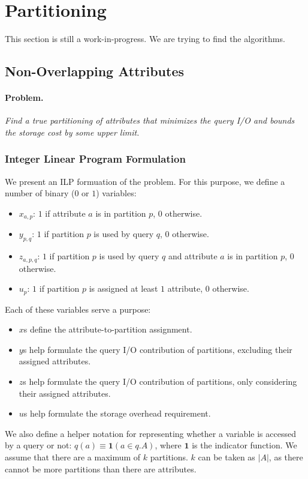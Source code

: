 \clearpage
\newpage
\section{Partitioning}
This section is still a work-in-progress. We are trying to find the algorithms.

\subsection{Non-Overlapping Attributes}

\paragraph*{Problem.$\,$} \emph{Find a true partitioning of attributes that
minimizes the query I/O and bounds the storage cost by some upper limit.}

\subsubsection{Integer Linear Program Formulation}
We present an ILP formuation of the problem. For this purpose, we define a 
number of binary ($0$ or $1$) variables: 
\begin{itemize}
\item $x_{a,p}$: $1$ if attribute $a$ is in partition $p$, $0$ otherwise.
\item $y_{p,q}$: $1$ if partition $p$ is used by query $q$, $0$ otherwise.
\item $z_{a,p,q}$: $1$ if partition $p$ is used by query $q$ and attribute $a$
is in partition $p$, $0$ otherwise.
\item $u_{p}$: $1$ if partition $p$ is assigned at least $1$ attribute, $0$ otherwise.
\end{itemize}

Each of these variables serve a purpose:
\begin{itemize}
\item $x$s define the attribute-to-partition assignment.
\item $y$s help formulate the query I/O contribution
of partitions, excluding their assigned attributes.
\item $z$s help formulate the query I/O contribution
of partitions, only considering their assigned attributes.
\item $u$s help formulate the storage overhead requirement.
\end{itemize}

We also define a helper notation for representing whether a variable is
accessed by a query or not: $q(a)\equiv \mathbf{1}(a \in q.A)$, where
$\mathbf{1}$ is the indicator function. We assume that there are a maximum of
$k$ partitions. $k$ can be taken as $|A|$, as there cannot be more partitions
than there are attributes.


